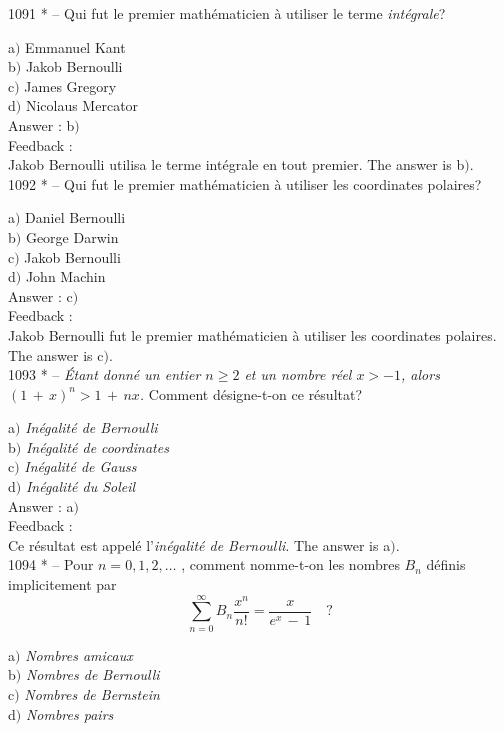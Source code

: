 \documentclass[letterpaper, 12pt]{article}
\begin{document}
1091 * -- Qui fut le premier math\'ematicien \`a utiliser le terme
{\sl int\'egrale}?

a$)$ Emmanuel Kant \\
b$)$ Jakob Bernoulli  \\
c$)$ James Gregory  \\
d$)$ Nicolaus Mercator\\

Answer : b$)$\\

Feedback : \\
Jakob Bernoulli utilisa le terme int\'egrale en tout premier.
The answer is b$)$.\\

1092 * -- Qui fut le premier math\'ematicien \`a utiliser les
coordinates polaires?

a$)$ Daniel Bernoulli \\
b$)$ George Darwin  \\
c$)$ Jakob Bernoulli  \\
d$)$ John Machin\\

Answer : c$)$\\

Feedback : \\
Jakob Bernoulli fut le premier math\'ematicien \`a utiliser les
coordinates polaires.
The answer is c$)$.\\

1093 * -- {\sl \'Etant donn\'e un entier $n\ge2$ et un nombre r\'eel
$x>-1$, alors $(1\,+\,x)^n>1\,+\,nx$.} Comment d\'esigne-t-on ce
r\'esultat?

a$)$ {\sl In\'egalit\'e de Bernoulli} \\
b$)$ {\sl In\'egalit\'e de coordinates}  \\
c$)$ {\sl In\'egalit\'e de Gauss}  \\
d$)$ {\sl In\'egalit\'e du Soleil}\\

Answer : a$)$\\

Feedback : \\
Ce r\'esultat est appel\'e l'{\sl in\'egalit\'e de Bernoulli}.
The answer is a$)$.\\

1094 * -- Pour $n=0,1,2,\ldots$ , comment nomme-t-on les nombres
$B_n$ d\'efinis implicitement par
$$\displaystyle{\sum_{n=0}^{\infty}B_n\frac{x^n}{n!}=\frac
x{e^x\,-\,1}}\quad ?$$

a$)$ {\sl Nombres amicaux} \\
b$)$ {\sl Nombres de Bernoulli}  \\
c$)$ {\sl Nombres de Bernstein}  \\
d$)$ {\sl Nombres pairs}\\
\end{document}
